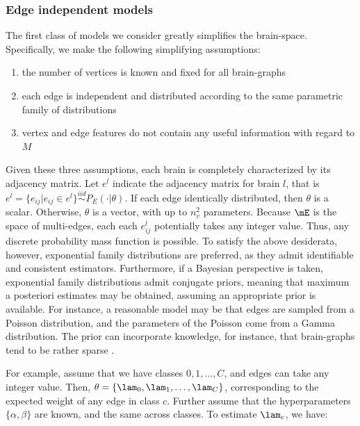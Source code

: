 \subsubsection{Edge independent models} %
\label{ssub:edge_indep}

The first class of models we consider greatly simplifies the brain-space.  Specifically, we make the following simplifying assumptions:

\begin{enumerate}
	\item the number of vertices is known and fixed for all brain-graphs
	\item each edge is independent and distributed according to the same parametric family of distributions
	\item vertex and edge features do not contain any useful information with regard to $M$
\end{enumerate}

Given these three assumptions, each brain is completely characterized by its adjacency matrix.  Let $e^l$ indicate the adjacency matrix for brain $l$, that is $e^l=\{e_{ij} | e_{ij} \in e^l\} \overset{iid}{\sim} P_E(\cdot | \theta)$.
% 
% 
If each edge identically distributed, then $\theta$ is a scalar. Otherwise, $\theta$ is a vector, with up to $n_v^2$ parameters.  Because $\mE$ is the space of multi-edges, each each $e^l_{ij}$ potentially takes any integer value.  Thus, any discrete probability mass function is possible.  To satisfy the above desiderata, however, exponential family distributions are preferred, as they admit identifiable and consistent estimators.  Furthermore, if a Bayesian perspective is taken, exponential family distributions admit conjugate priors, meaning that maximum a posteriori estimates may be obtained, assuming an appropriate prior is available.  For instance, a reasonable model may be that edges are sampled from a Poisson distribution, and the parameters of the Poisson come from a Gamma distribution.  The prior can incorporate knowledge, for instance, that brain-graphs tend to be rather sparse \cite{?}.  

For example, assume that we have classes $0,1,\ldots, C$, and edges can take any integer value.  Then,  $\theta=\{\lam_0,\lam_1, \ldots, \lam_C\}$, corresponding to the expected weight of any edge in class $c$.  Further assume  that the hyperparameters $\{\alpha,\beta\}$ are known, and the same across classes.  To estimate $\lam_c$, we have:


